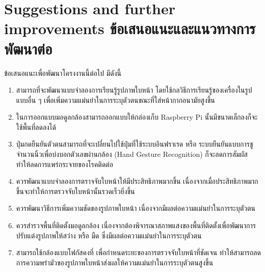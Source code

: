 \section{\ifenglish%
Suggestions and further improvements
\else%
ข้อเสนอแนะและแนวทางการพัฒนาต่อ
\fi
}

ข้อเสนอแนะเพื่อพัฒนาโครงงานนี้ต่อไป มีดังนี้
\begin{enumerate}
    \item สามารถที่จะพัฒนาแบบจำลองการเรียนรู้รูปภาพใบหน้า โดยใช้กลวิธีการเรียนรู้ของเครื่องในรูปแบบอื่น ๆ เพื่อเพิ่มความแม่นยำในการระบุตัวตนขณะที่ใส่หน้ากากอนามัยสูงขึ้น
    \item ในการออกแบบมอดูลกล้องสามารถออกแบบให้กล่องเก็บ Raspberry Pi นั้นมีขนาดเล็กลงก็จะใช้พื้นที่ลดลงได้
    \item ปุ่มกดยืนยันตัวตนสามารถที่จะเปลี่ยนไปใช้ปุ่มที่ใช้ระบบอินฟราเรด หรือ ระบบยืนยันแบบการชูจำนวนนิ้วเพื่อบ่งบอกตัวเลขผ่านกล้อง (Hand Gesture Recognition) ก็จะลดการสัมผัสทำให้ลดการแพร่กระจายของโรคติดต่อ 
    \item ควรพัฒนาแบบจำลองการตราจจับใบหน้าให้มีประสิทธิภาพมากขึ้น เนื่องจากเมื่อประสิทธิภาพมากขึ้นจะทำให้การตรวจจับใบหน้านั้นรวดเร็วยิ่งขึ้น
    \item ควรพัฒนาวิธีการเพิ่มความชัดของรูปภาพใบหน้า เนื่องจากมีผลต่อความแม่นยำในการระบุตัวตน
    \item ควรสำรวจพื้นที่ติดตั้งมอดูลกล้อง เนื่องจากต้องพิจารณาสภาพแสงของพื้นที่ติดตั้งเพื่อพัฒนาการปรับแต่งรูปภาพให้สว่าง หรือ มืด ซึ่งมีผลต่อความแม่นยำในการระบุตัวตน
    \item สามารถใช้กล้องแบบโฟกัสคงที่ เพื่อกำหนดระยะของการตรวจจับใบหน้าที่ชัดเจน ทำให้สามารถลดการความพร่ามัวของรูปภาพใบหน้าส่งผลให้ความแม่นยำในการระบุตัวตนสูงขึ้น 
\end{enumerate}
